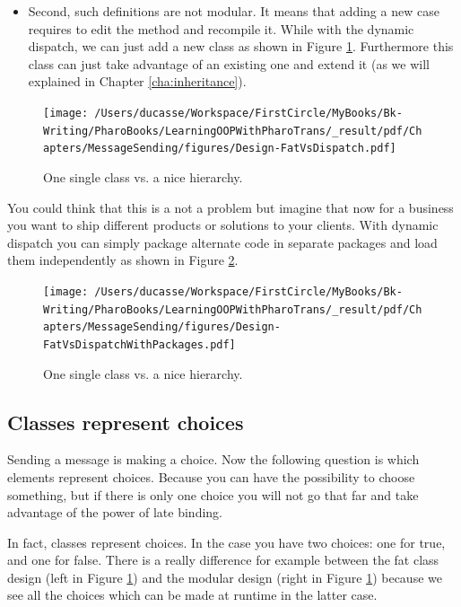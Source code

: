 \documentclass[10pt,twoside,english]{_support/latex/sbabook/sbabook}
\begin{document}
\begin{itemize}
\item Second, such definitions are not modular. It means that adding a new case requires to edit the method and recompile it. While with the dynamic dispatch, we can just add a new class as shown in Figure \ref{figFat}. Furthermore this class can just take advantage of an existing one and extend it (as we will explained in Chapter \ref{cha:inheritance}).
\end{itemize}


\begin{figure}

\begin{center}
\texttt{[image: /Users/ducasse/Workspace/FirstCircle/MyBooks/Bk-Writing/PharoBooks/LearningOOPWithPharoTrans/\_result/pdf/Chapters/MessageSending/figures/Design-FatVsDispatch.pdf]}\caption{One single class vs. a nice hierarchy.\label{figFat}}\end{center}
\end{figure}


You could think that this is a not a problem but imagine that now for a business you want to ship different products or solutions to your clients. With dynamic dispatch you can simply package alternate code in separate packages and load them independently as shown in Figure \ref{inhNoFatPackage}.


\begin{figure}

\begin{center}
\texttt{[image: /Users/ducasse/Workspace/FirstCircle/MyBooks/Bk-Writing/PharoBooks/LearningOOPWithPharoTrans/\_result/pdf/Chapters/MessageSending/figures/Design-FatVsDispatchWithPackages.pdf]}\caption{One single class vs. a nice hierarchy.\label{inhNoFatPackage}}\end{center}
\end{figure}

\subsection{Classes represent choices}
Sending a message is making a choice. Now the following question is which elements represent choices. Because you can have the possibility to choose something, but if there is only one choice you will not go that far and take advantage of the power of late binding.

In fact, classes represent choices. In the  case you have two choices: one for true, and one for false.
There is a really difference for example between the fat class design (left in Figure \ref{figFat}) and the modular design (right in Figure \ref{figFat}) because we see all the choices which can be made at runtime in the latter case.
\end{document}
